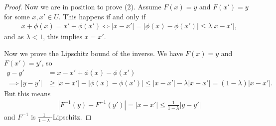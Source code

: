 \begin{proof}
    Now we are in position to prove (2). Assume $F(x) = y$ and $F(x') = y$ for some $x,x' \in U$. This happens if and only if
    \begin{align*}
        x + \phi(x) = x' + \phi(x') \iff \left| x-x' \right| = \left| \phi(x) - \phi(x') \right| \leq \lambda \left| x - x' \right|,
    \end{align*}
    and as $\lambda < 1$, this implies $x = x'$.

    Now we prove the Lipschitz bound of the inverse. We have $F(x) = y$ and $F(x') = y'$, so 
    \begin{align*}
        y - y' &= x - x' + \phi(x) - \phi(x') \\ 
        \implies \left| y - y' \right| &\geq \left| x - x' \right| - \left| \phi(x) - \phi(x') \right| 
        \leq \left| x-x' \right| - \lambda\left| x-x' \right| = (1-\lambda)\left| x-x' \right|.
    \end{align*}
    But this means 
    \begin{align*}
        \left| F^{-1}(y) - F^{-1}(y') \right| = \left| x-x' \right| \leq \frac{1}{1-\lambda} \left| y - y' \right|
    \end{align*}
    and $F^{-1}$ is $\frac{1}{1-\lambda}$-Lipschitz.
\end{proof}

\newpage


